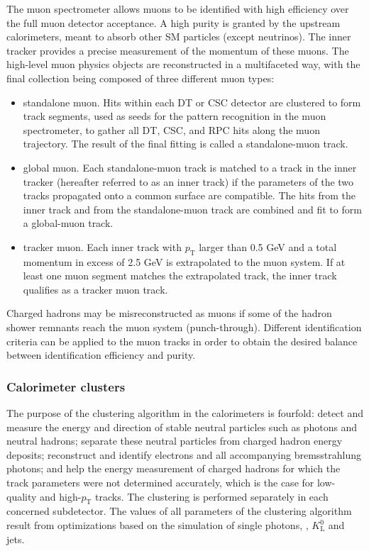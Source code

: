  The  muon  spectrometer allows muons to be identified with high efficiency over the full muon detector acceptance.  A high purity is granted by the upstream calorimeters, meant to absorb other SM particles (except neutrinos).  The inner tracker provides a precise measurement of the momentum of these muons.  The high-level muon physics objects are reconstructed in a multifaceted way, with the final collection being composed of three different muon types:
 
 \begin{itemize}
     \item standalone muon.  Hits within each DT or CSC detector are clustered to form track segments,  used as seeds for the pattern recognition in the muon spectrometer,  to gather all DT, CSC, and RPC hits along the muon trajectory.  The result of the final fitting is called a standalone-muon track.
     \item global muon.  Each standalone-muon track is matched to a track in the inner tracker (hereafter referred to as an inner track) if the parameters of the two tracks propagated onto a common surface are compatible.  The hits from the inner track and from the standalone-muon track are combined and fit to form a global-muon track.
     \item tracker muon. Each inner track with $p_{\mathrm{T}}$ larger than 0.5 GeV and a total momentum in excess of 2.5 GeV is extrapolated to the muon system. If at least one muon segment matches the extrapolated track, the inner track qualifies as a tracker muon track.
 \end{itemize}
 
 Charged hadrons may be misreconstructed as muons if some of the hadron shower remnants reach the muon system (punch-through).  Different identification criteria can be applied to the muon tracks in order to obtain the desired balance between identification efficiency and purity. 

\subsubsection{Calorimeter clusters}

The purpose of the clustering algorithm in the calorimeters is fourfold: detect and measure the energy and direction of stable neutral particles such as photons and neutral hadrons; separate these neutral particles from charged hadron energy deposits; reconstruct and identify electrons and all accompanying bremsstrahlung photons; and help the energy measurement of charged hadrons for which the track parameters were not determined accurately, which is the case for low-quality and high-$p_{\mathrm{T}}$ tracks. The clustering is performed separately in each concerned subdetector. The values of all parameters of the clustering algorithm result from optimizations based on the simulation of single photons, \pizero, $K^0_{\mathrm{L}}$ and jets.

